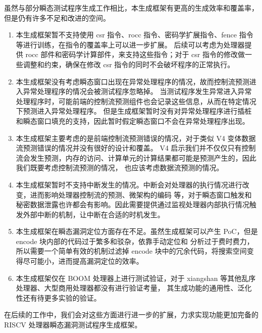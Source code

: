 虽然与部分瞬态测试程序生成工作相比，本生成框架有更高的生成效率和覆盖率，但是仍有许多不足和改进的空间。\par

\begin{enumerate}
    \item 本生成框架暂不支持使用 csr 指令、rocc 指令、密码学扩展指令、fence 指令等进行训练，在指令的覆盖率上可以进一步扩展。
后续可以考虑为处理器提供 rocc 部件和密码学计算部件，来支持这些指令；对于 csr 指令的修改做一些调整和约束，确保在修改 csr
指令的同时不会破坏程序的正常执行。\par
    \item 本生成框架没有考虑瞬态窗口出现在异常处理程序的情况，故而控制流预测进入异常处理程序的情况会被测试程序忽略掉。
当测试程序发生异常进入异常处理程序时，可能前端的控制流预测组件也会记录这些信息，从而在特定情况下预测进入异常处理程序。
但是生成框架暂时没有对异常处理程序进行插桩和瞬态窗口填充的支持，因此暂时假定瞬态窗口不会在异常处理程序出现。\par
    \item 本生成框架主要考虑的是前端控制流预测错误的情况，对于类似 V4 变体数据流预测错误的情况并没有很好的设计和覆盖。
V4 启示我们并不仅仅只有控制流会发生预测，内存的访问、计算单元的计算结果都可能是预测产生的，因此我们既要考虑控制流预测的情况，
也应该考虑数据流预测的情况。\par
    \item 本生成框架暂时不支持中断发生的情况。中断会对处理器的执行情况进行改变，进而影响处理器控制流的预测、微架构的编码
等，对于瞬态窗口触发和秘密数据泄露也许都会有影响。因此需要提供通过监视处理器内部执行情况触发外部中断的机制，让中断在合适的时机发生。\par
    \item 本生成框架在瞬态漏洞定位方面存在不足。虽然生成框架可以产生 PoC，但是 encode 块内部的代码过于繁多和驳杂，依靠手动定位和
分析过于费时费力，所以需要一个简单有效的机制过滤掉 encode 块中的冗余代码，将搜索空间变得尽可能小，进而提高漏洞定位的效率。\par
    \item 本生成框架仅在 BOOM 处理器上进行测试验证，对于 xiangshan 等其他乱序处理器、大型商用处理器都没有进行验证考量，
其生成功能的通用性、泛化性还有待更多实验的验证。\par
\end{enumerate}

在后续的工作中，我们会对这些方面进行进一步的扩展，力求实现功能更加完备的 RISCV 处理器瞬态漏洞测试程序生成框架。\par


